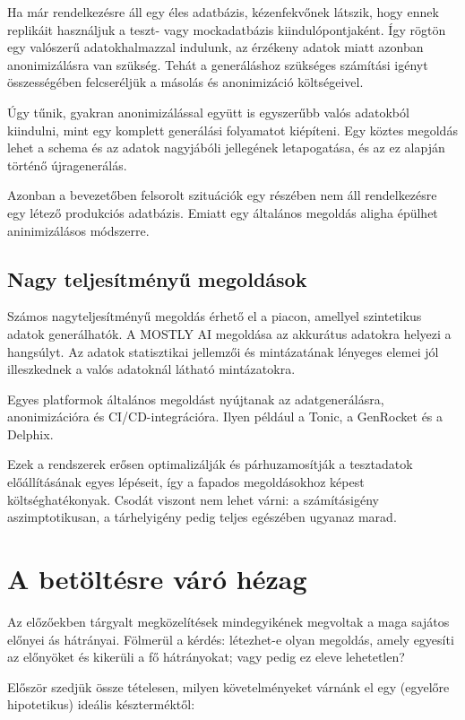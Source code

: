 \documentclass[
    parspace,
    noindent,
    nohyp,
]{elteiktdk}[2023/04/10]
\begin{document}
Ha már rendelkezésre áll egy éles adatbázis, kézenfekvőnek látszik,
hogy ennek replikáit használjuk a teszt- vagy mockadatbázis kiindulópontjaként.
Így rögtön egy valószerű adatokhalmazzal indulunk, az érzékeny adatok miatt azonban anonimizálásra van szükség. Tehát a generáláshoz szükséges számítási igényt összességében
felcseréljük a másolás és anonimizáció költségeivel.

Úgy tűnik, gyakran anonimizálással együtt is egyszerűbb valós adatokból kiindulni,
mint egy komplett generálási folyamatot kiépíteni.
Egy köztes megoldás lehet a schema és az adatok nagyjábóli jellegének letapogatása,
és az ez alapján történő újragenerálás.

Azonban a bevezetőben felsorolt szituációk egy részében nem áll rendelkezésre egy létező produkciós adatbázis.
Emiatt egy általános megoldás aligha épülhet aninimizálásos módszerre.

\subsection{Nagy teljesítményű megoldások}

Számos nagyteljesítményű megoldás érhető el a piacon, amellyel szintetikus adatok generálhatók. A MOSTLY AI megoldása az akkurátus adatokra helyezi a hangsúlyt. Az adatok statisztikai jellemzői és mintázatának lényeges elemei jól illeszkednek a valós adatoknál látható mintázatokra.

Egyes platformok általános megoldást nyújtanak az adatgenerálásra, anonimizációra és CI/CD-integrációra.
Ilyen például a Tonic, a GenRocket és a Delphix.

Ezek a rendszerek erősen optimalizálják és párhuzamosítják a tesztadatok előállításának egyes lépéseit,
így a fapados megoldásokhoz képest költséghatékonyak.
Csodát viszont nem lehet várni: a számításigény aszimptotikusan,
a tárhelyigény pedig teljes egészében ugyanaz marad.

\section{A betöltésre váró hézag}

Az előzőekben tárgyalt megközelítések mindegyikének megvoltak a maga sajátos előnyei ás hátrányai.
Fölmerül a kérdés: létezhet-e olyan megoldás, amely egyesíti az előnyöket és kikerüli a fő hátrányokat;
vagy pedig ez eleve lehetetlen?

Először szedjük össze tételesen, milyen követelményeket várnánk el
egy (egyelőre hipotetikus) ideális készterméktől:
\end{document}
